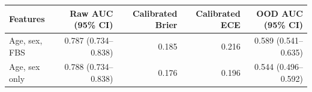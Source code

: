 \begin{tabular}{lrrrr}
\toprule
Features & Raw AUC (95\% CI) & Calibrated Brier & Calibrated ECE & OOD AUC (95\% CI) \\
\midrule
Age, sex, FBS & 0.787 (0.734--0.838) & 0.185 & 0.216 & 0.589 (0.541--0.635) \\
Age, sex only & 0.788 (0.734--0.838) & 0.176 & 0.196 & 0.544 (0.496--0.592) \\
\bottomrule
\end{tabular}

